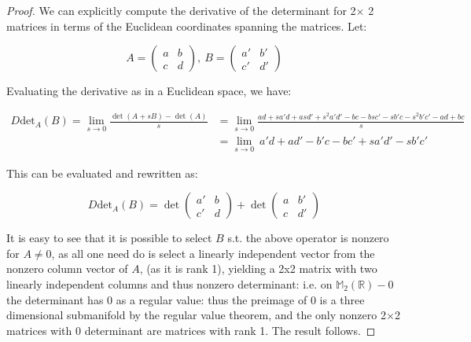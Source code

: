 \message{ !name(Homework3.tex)}\documentclass{article}
\begin{document}
\begin{proof}
  We can explicitly compute the derivative of the determinant for 2$\times$ 2 matrices in terms of the Euclidean coordinates spanning the matrices. Let:

  \[
    A = \begin{pmatrix} a & b \\ c & d \end{pmatrix}, \ B = \begin{pmatrix} a' & b' \\ c' & d' \end{pmatrix} 
  \]

  Evaluating the derivative as in a Euclidean space, we have:
  
  \begin{align*}
 D \text{det}_{A}(B) = \lim_{s \to 0}\frac{\det(A+sB) - \det(A)}{s} & = \lim_{s\to 0} \frac{ad + sa'd + asd' + s^{2}a'd' - bc - bsc' - sb'c - s^{2}b'c' -ad + bc}{s} \\ & = \lim_{s\to 0} \ a'd + ad' - b'c - bc' + sa'd' - sb'c'
\end{align*}

This can be evaluated and rewritten as:

\[
D \text{det}_{A}(B) = \det \begin{pmatrix} a' & b \\ c' & d \end{pmatrix} + \det \begin{pmatrix} a & b' \\ c & d' \end{pmatrix}
\]

It is easy to see that it is possible to select $B$ s.t. the above operator is nonzero for $A \neq 0$, as all one need do is select a linearly independent vector from the nonzero column vector of $A$, (as it is rank 1), yielding a 2x2 matrix with two linearly independent columns and thus nonzero determinant: i.e. on $\mathbb{M}_{2}(\mathbb{R}) - 0$ the determinant has $0$ as a regular value: thus the preimage of 0 is a three dimensional submanifold by the regular value theorem, and the only nonzero 2$\times$2 matrices with 0 determinant are matrices with rank 1. The result follows. 
\end{proof}
\end{document}
